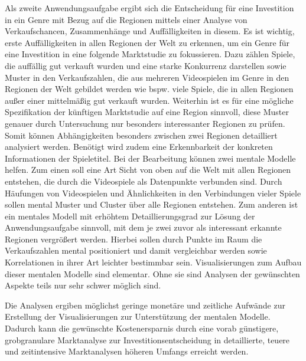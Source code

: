\documentclass[usegeometry=true]{scrartcl}
\begin{document}
Als zweite Anwendungsaufgabe ergibt sich die Entscheidung für eine Investition in ein Genre mit Bezug auf die Regionen mittels einer Analyse von Verkaufschancen, Zusammenhänge und Auffälligkeiten in diesem.
Es ist wichtig, erste Auffälligkeiten in allen Regionen der Welt zu erkennen, um ein Genre für eine Investition in eine folgende Marktstudie zu fokussieren.
Dazu zählen Spiele, die auffällig gut verkauft wurden und eine starke Konkurrenz darstellen sowie Muster in den Verkaufszahlen, 
die aus mehreren Videospielen im Genre in den Regionen der Welt gebildet werden wie bspw. viele Spiele, die in allen Regionen außer einer mittelmäßig gut verkauft wurden.
Weiterhin ist es für eine mögliche Spezifikation der künftigen Marktstudie auf eine Region sinnvoll, diese Muster genauer durch Untersuchung nur besonders interessanter Regionen zu prüfen. 
Somit können Abhängigkeiten besonders zwischen zwei Regionen detailliert analysiert werden. 
Benötigt wird zudem eine Erkennbarkeit der konkreten Informationen der Spieletitel. 
Bei der Bearbeitung können zwei mentale Modelle helfen.
Zum einen soll eine Art Sicht von oben auf die Welt mit allen Regionen entstehen, die durch die Videospiele als Datenpunkte verbunden sind. 
Durch Häufungen von Videospielen und Ähnlichkeiten in den Verbindungen vieler Spiele sollen mental Muster und Cluster über alle Regionen entstehen.
Zum anderen ist ein mentales Modell mit erhöhtem Detaillierungsgrad zur Lösung der Anwendungsaufgabe sinnvoll, mit dem je zwei zuvor als interessant erkannte Regionen vergrößert werden. 
Hierbei sollen durch Punkte im Raum die Verkaufszahlen mental positioniert und damit vergleichbar werden sowie Korrelationen in ihrer Art leichter bestimmbar sein. 
Visualisierungen zum Aufbau dieser mentalen Modelle sind elementar.
Ohne sie sind Analysen der gewünschten Aspekte teils nur sehr schwer möglich sind.

Die Analysen ergiben möglichst geringe monetäre und zeitliche Aufwände zur Erstellung der Visualisierungen 
zur Unterstützung der mentalen Modelle.
Dadurch kann die gewünschte Kostenersparnis durch eine vorab günstigere, grobgranulare Marktanalyse zur Investitionsentscheidung in 
detaillierte, teuere und zeitintensive Marktanalysen höheren Umfangs erreicht werden.
\end{document}

